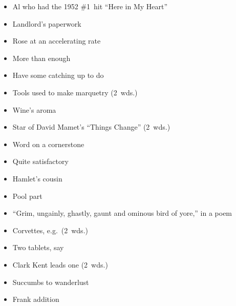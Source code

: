 {\begin{itemize}
      \item
        Al who had the 1952 \#1~hit ``Here in My Heart''
      \item
        Landlord's paperwork
    \end{itemize}
  \item
    \begin{itemize}
      \item
        Rose at an accelerating rate
      \item
        More than enough
    \end{itemize}
  \item
    \begin{itemize}
      \item
        Have some catching up to do
      \item
        Tools used to make marquetry (2~wds.)
    \end{itemize}
  \item
    \begin{itemize}
      \item
        Wine's aroma
      \item
        Star of David Mamet's ``Things Change'' (2~wds.)
    \end{itemize}
  \item
    \begin{itemize}
      \item
        Word on a cornerstone
      \item
        Quite satisfactory
    \end{itemize}
  \item
    \begin{itemize}
      \item
        Hamlet's cousin
      \item
        Pool part
    \end{itemize}
}{%
  \item
    \begin{itemize}
      \item
        ``Grim, ungainly, ghastly, gaunt and ominous bird of yore,'' in a poem
      \item
        Corvettes, e.g.\ (2~wds.)
      \item
        Two tablets, say
      \item
        Clark Kent leads one (2~wds.)
      \item
        Succumbs to wanderlust
      \item
        Frank addition
    \end{itemize}
}
